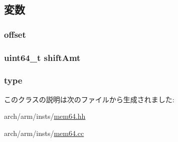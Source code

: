 \subsection{変数}
\hypertarget{classArmISA_1_1MemoryReg64_ad79e279288c1e6eacd9fced538dd1d7c}{
\subsubsection[{offset}]{ {\bf offset}}}
\label{classArmISA_1_1MemoryReg64_ad79e279288c1e6eacd9fced538dd1d7c}
\hypertarget{classArmISA_1_1MemoryReg64_af6cfb90c73bfd849b872e44c63c95fa1}{
\subsubsection[{shiftAmt}]{\setlength{\rightskip}{0pt plus 5cm}uint64\_\-t {\bf shiftAmt}}}
\label{classArmISA_1_1MemoryReg64_af6cfb90c73bfd849b872e44c63c95fa1}
\hypertarget{classArmISA_1_1MemoryReg64_a0822cc4af9f88047e13ca95f7d8c0830}{
\subsubsection[{type}]{ {\bf type}}}
\label{classArmISA_1_1MemoryReg64_a0822cc4af9f88047e13ca95f7d8c0830}


このクラスの説明は次のファイルから生成されました:\begin{DoxyCompactItemize}
\item 
arch/arm/insts/\hyperlink{mem64_8hh}{mem64.hh}\item 
arch/arm/insts/\hyperlink{mem64_8cc}{mem64.cc}\end{DoxyCompactItemize}
